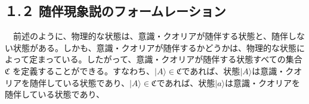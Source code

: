 \subsection{１.２ 随伴現象説のフォームレーション}
　前述のように、物理的な状態は、意識・クオリアが随伴する状態と、随伴しない状態がある。しかも、意識・クオリアが随伴するかどうかは、物理的な状態によって定まっている。したがって、意識・クオリアが随伴する状態すべての集合 $\mathfrak{C}$ を定義することができる。すなわち、$|A\rangle\in\mathfrak{C}$であれば、状態$|A\rangle$は意識・クオリアを随伴している状態であり、$|A\rangle\in\mathfrak{C}$であれば、状態$|a\rangle$は意識・クオリアを随伴している状態であり、